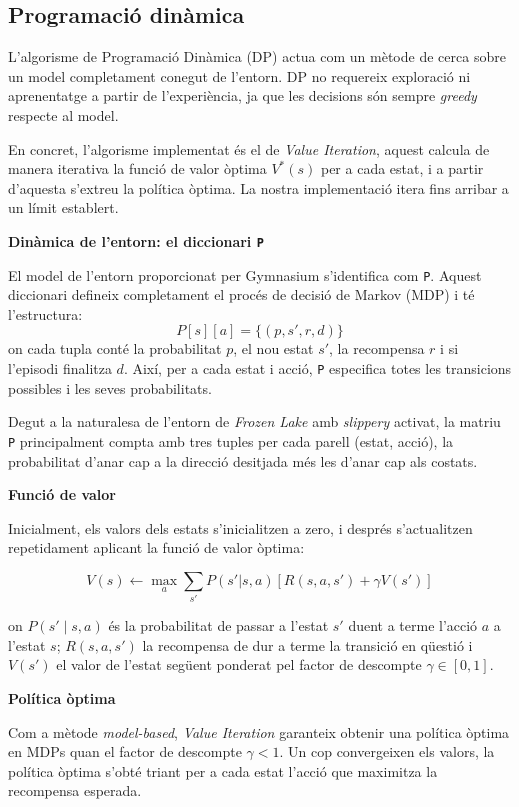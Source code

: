 \documentclass[12pt,a4paper]{report}
\begin{document}
\newpage
\subsection{Programació dinàmica}

L'algorisme de Programació Dinàmica (DP) actua com un mètode de cerca sobre un model completament conegut de l'entorn.
DP no requereix exploració ni aprenentatge a partir de l'experiència, ja que les decisions són sempre \textit{greedy}
respecte al model.

En concret, l'algorisme implementat és el de \textit{Value Iteration}, aquest calcula de manera iterativa la
funció de valor òptima $V^*(s)$ per a cada estat, i a partir d'aquesta s'extreu la política òptima.
La nostra implementació itera fins arribar a un límit establert.

\textbf{Dinàmica de l'entorn: el diccionari \texttt{P}}

El model de l'entorn proporcionat per Gymnasium s'identifica com \texttt{P}.
Aquest diccionari defineix completament el procés de decisió de Markov (MDP) i té l'estructura:
\[
  P[s][a] = \{ (p, s', r, d) \}
\]
on cada tupla conté la probabilitat $p$, el nou estat $s'$,
la recompensa $r$ i si l'episodi finalitza $d$. Així, per a cada estat i acció, \texttt{P}
especifica totes les transicions possibles i les seves probabilitats.

Degut a la naturalesa de l'entorn de \textit{Frozen Lake} amb \textit{slippery} activat, la matriu \texttt{P} principalment compta amb tres tuples per
cada parell (estat, acció), la probabilitat d'anar cap a la direcció desitjada més les d'anar cap als costats.

\textbf{Funció de valor}

Inicialment, els valors dels estats s'inicialitzen a zero, i després s'actualitzen repetidament aplicant la funció de valor òptima:

\[
  V(s) \gets \max_a \sum_{s'} P(s'|s,a) \left[ R(s,a,s') + \gamma V(s') \right]
\]

on $P(s'\mid s, a)$ és la probabilitat de passar a l'estat $s'$ duent a terme l'acció $a$ a l'estat $s$; $R(s,a,s')$ la recompensa
de dur a terme la transició en qüestió i $V(s')$ el valor de l'estat següent ponderat pel factor de descompte $\gamma \in [0,1]$.

\textbf{Política òptima}

Com a mètode \textit{model-based}, \textit{Value Iteration} garanteix obtenir una política òptima en MDPs
quan el factor de descompte $\gamma < 1$.
Un cop convergeixen els valors, la política òptima s'obté triant per a cada estat l'acció que maximitza la
recompensa esperada.
\end{document}
